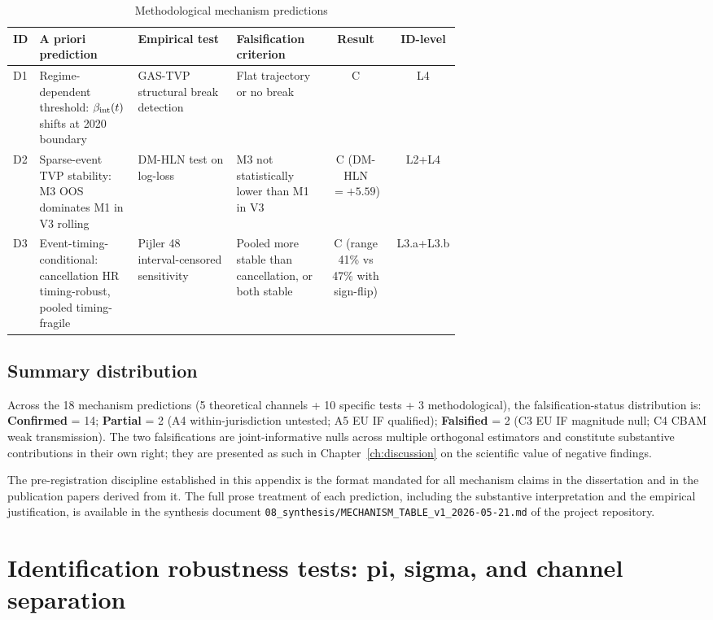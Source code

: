 \begin{table}[!htbp]
\centering
\caption{Methodological mechanism predictions}
\label{tab:app-mech-C}
\small
\begin{tabular}{lp{0.22\linewidth}p{0.22\linewidth}p{0.20\linewidth}cc}
\toprule
ID & A priori prediction & Empirical test & Falsification criterion & Result & ID-level \\
\midrule
D1 & Regime-dependent threshold: $\beta_{\mathrm{int}}(t)$ shifts at 2020 boundary & GAS-TVP structural break detection & Flat trajectory or no break & C & L4 \\
D2 & Sparse-event TVP stability: M3 OOS dominates M1 in V3 rolling & DM-HLN test on log-loss & M3 not statistically lower than M1 in V3 & C (DM-HLN $=+5.59$) & L2+L4 \\
D3 & Event-timing-conditional: cancellation HR timing-robust, pooled timing-fragile & Pijler 48 interval-censored sensitivity & Pooled more stable than cancellation, or both stable & C (range 41\% vs 47\% with sign-flip) & L3.a+L3.b \\
\bottomrule
\end{tabular}
\end{table}

\subsection*{Summary distribution}

Across the 18 mechanism predictions (5 theoretical channels + 10 specific tests + 3 methodological), the falsification-status distribution is: \textbf{Confirmed} = 14; \textbf{Partial} = 2 (A4 within-jurisdiction untested; A5 EU IF qualified); \textbf{Falsified} = 2 (C3 EU IF magnitude null; C4 CBAM weak transmission). The two falsifications are joint-informative nulls across multiple orthogonal estimators and constitute substantive contributions in their own right; they are presented as such in Chapter~\ref{ch:discussion} on the scientific value of negative findings.

The pre-registration discipline established in this appendix is the format mandated for all mechanism claims in the dissertation and in the publication papers derived from it. The full prose treatment of each prediction, including the substantive interpretation and the empirical justification, is available in the synthesis document \texttt{08\_synthesis/MECHANISM\_TABLE\_v1\_2026-05-21.md} of the project repository.


\section{Identification robustness tests: pi, sigma, and channel separation}
\label{app:identification-tests}

